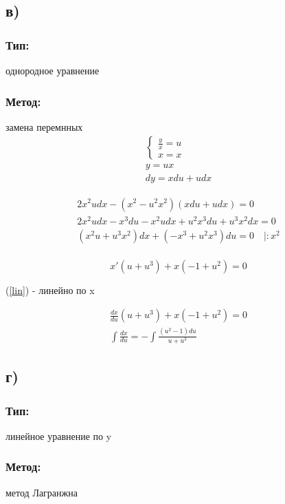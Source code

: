 \documentclass{article}
\begin{document}
\subsection*{в)}
\subsubsection*{Тип:} 
однородное уравнение

\subsubsection*{Метод:}
замена перемнных
\begin{gather*}
\begin{cases}
\frac{y}{x}=u \\
x=x
\end{cases}\\
y=ux \\
dy=xdu+udx  
\end{gather*}

\begin{gather*}
    2x^2udx-(x^2-u^2x^2)(xdu+udx)=0 \\
    2x^2udx-x^3du-x^2udx+u^2x^3du+u^3x^2dx=0 \\
    (x^2u+u^3x^2)dx+(-x^3+u^2x^3)du=0 \quad |:x^2 \\
\end{gather*}

\begin{equation}
    x'(u+u^3)+x(-1+u^2)=0 \label{lin}
\end{equation}

(\ref{lin}) - линейно по x

\begin{gather*}
    \frac{dx}{du}(u+u^3)+x(-1+u^2)=0\\
    \int\frac{dx}{du}=-\int\frac{(u^2-1)du}{u+u^3}
\end{gather*}

\subsection*{г)}
\subsubsection*{Тип:} 
линейное уравнение по y

\subsubsection*{Метод:}
метод Лагранжна
\end{document}

